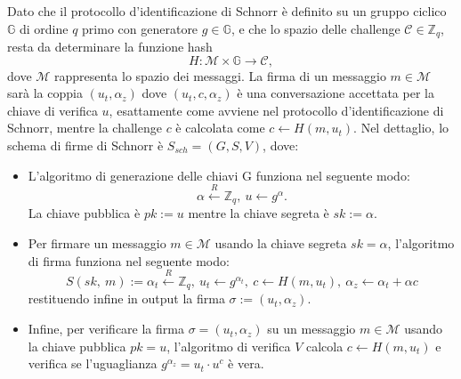  Dato che il protocollo d'identificazione di Schnorr è definito su un gruppo ciclico $\mathbb{G}$ di ordine $q$ primo con generatore $g \in \mathbb{G}$, e che lo spazio delle challenge $\mathcal{C} \in \mathbb{Z}_q$, resta da determinare la funzione hash 
 \[H: \mathcal{M} \times \mathbb{G} \rightarrow \mathcal{C},\] dove $\mathcal{M}$ rappresenta lo spazio dei messaggi. La firma di un messaggio $m \in \mathcal{M}$ sarà la coppia $(u_t, \alpha_z)$ dove $(u_t, c, \alpha_z)$ è una conversazione accettata per la chiave di verifica $u$, esattamente come avviene nel protocollo d'identificazione di Schnorr, mentre la challenge $c$ è calcolata come $c \leftarrow H(m, u_t)$. Nel dettaglio, lo schema di firme di Schnorr è $S_{sch} = (G, S, V)$, dove:

 \begin{itemize}
     \item L'algoritmo di generazione delle chiavi G funziona nel seguente modo:
     \[
     \alpha \overset{R}{\leftarrow} \mathbb{Z}_q,\ u \leftarrow g^\alpha.
     \]
     La chiave pubblica è $pk := u$ mentre la chiave segreta è $sk := \alpha$.
     \item Per firmare un messaggio $m \in \mathcal{M}$ usando la chiave segreta $sk = \alpha$, l'algoritmo di firma funziona nel seguente modo:
     \[
     S(sk,\ m) := \alpha_t \overset{R}{\leftarrow} \mathbb{Z}_q,\ u_t \leftarrow g^{\alpha_t},\ c \leftarrow H(m, u_t),\ \alpha_z \leftarrow \alpha_t + \alpha c
     \]
     restituendo infine in output la firma $\sigma := (u_t, \alpha_z)$.
     \item Infine, per verificare la firma $\sigma = (u_t, \alpha_z)$ su un messaggio $m \in \mathcal{M}$ usando la chiave pubblica $pk = u$, l'algoritmo di verifica $V$ calcola $c \leftarrow H(m, u_t)$ e verifica se l'uguaglianza $g^{\alpha_z} = u_t \cdot u^c$ è vera.
 \end{itemize}